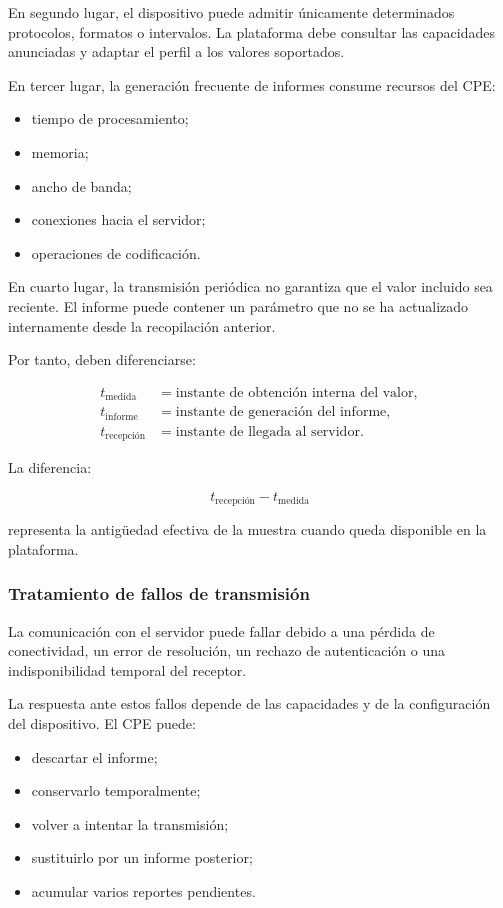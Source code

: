 En segundo lugar, el dispositivo puede admitir únicamente determinados
protocolos, formatos o intervalos. La plataforma debe consultar las
capacidades anunciadas y adaptar el perfil a los valores soportados.

En tercer lugar, la generación frecuente de informes consume recursos
del CPE:

\begin{itemize}
    \item tiempo de procesamiento;
    \item memoria;
    \item ancho de banda;
    \item conexiones hacia el servidor;
    \item operaciones de codificación.
\end{itemize}

En cuarto lugar, la transmisión periódica no garantiza que el valor
incluido sea reciente. El informe puede contener un parámetro que no se
ha actualizado internamente desde la recopilación anterior.

Por tanto, deben diferenciarse:

\[
\begin{aligned}
    t_{\mathrm{medida}}
    &=
    \text{instante de obtención interna del valor},\\
    t_{\mathrm{informe}}
    &=
    \text{instante de generación del informe},\\
    t_{\mathrm{recepción}}
    &=
    \text{instante de llegada al servidor}.
\end{aligned}
\]

La diferencia:

\[
    t_{\mathrm{recepción}} - t_{\mathrm{medida}}
\]

representa la antigüedad efectiva de la muestra cuando queda disponible
en la plataforma.


\subsubsection*{Tratamiento de fallos de transmisión}

La comunicación con el servidor puede fallar debido a una pérdida de
conectividad, un error de resolución, un rechazo de autenticación o una
indisponibilidad temporal del receptor.

La respuesta ante estos fallos depende de las capacidades y de la
configuración del dispositivo. El CPE puede:

\begin{itemize}
    \item descartar el informe;
    \item conservarlo temporalmente;
    \item volver a intentar la transmisión;
    \item sustituirlo por un informe posterior;
    \item acumular varios reportes pendientes.
\end{itemize}

